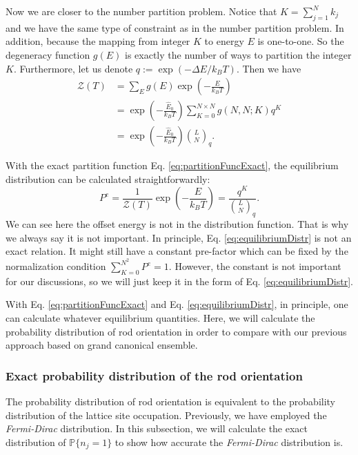 Now we are closer to the number partition problem. Notice that $K=\sum_{j=1}^{N}k_j$ and we have the same type of constraint as in the number partition problem. In addition, because the mapping from integer $K$ to energy $E$ is one-to-one. So the degeneracy function $g(E)$ is exactly the number of ways to partition the integer $K$. Furthermore, let us denote $q:=\exp\left(-\Delta E/ k_B T\right)$. Then we have
\begin{equation}
    \begin{aligned}
    \label{eq:partitionFuncExact}
    \mathcal{Z}\left(T\right) & = \sum_{E}g(E)\exp \left(-\frac{E}{k_B T}\right) \\ 
    & = \exp\left(-\frac{\hat{E}_0}{k_B T}\right)\sum_{K=0}^{N \times N} g(N, N; K) q^K \\
    & = \exp\left(-\frac{\hat{E}_0}{k_B T}\right)\binom{L}{N}_q.
    \end{aligned}
\end{equation}


With the exact partition function Eq. \eqref{eq:partitionFuncExact}, the equilibrium distribution can be calculated straightforwardly:
\begin{equation}
    \label{eq:equilibriumDistr}
    P^{e} = \frac{1}{\mathcal{Z}\left(T\right)}\exp\left(-\frac{E}{k_B T}\right) = \frac{q^K}{\binom{L}{N}_q}.
\end{equation}
We can see here the offset energy is not in the distribution function. That is why we always say it is not important. In principle, Eq. \eqref{eq:equilibriumDistr} is not an exact relation. It might still have a constant pre-factor which can be fixed by the normalization condition $\sum_{K=0}^{N^2} P^e = 1$. However, the constant is not important for our discussions, so we will just keep it in the form of Eq. \eqref{eq:equilibriumDistr}.

With Eq. \eqref{eq:partitionFuncExact} and Eq. \eqref{eq:equilibriumDistr}, in principle, one can calculate whatever equilibrium quantities. Here, we will calculate the probability distribution of rod orientation in order to compare with our previous approach based on grand canonical ensemble. 

\subsubsection{Exact probability distribution of the rod orientation}
\label{ssub:Exact probability distribution of the rod orientation}
The probability distribution of rod orientation is equivalent to the probability distribution of the lattice site occupation. Previously, we have employed the \emph{Fermi-Dirac} distribution. In this subsection, we will calculate the exact distribution of $\mathbb{P}\{n_j=1\}$ to show how accurate the \emph{Fermi-Dirac} distribution is. 

